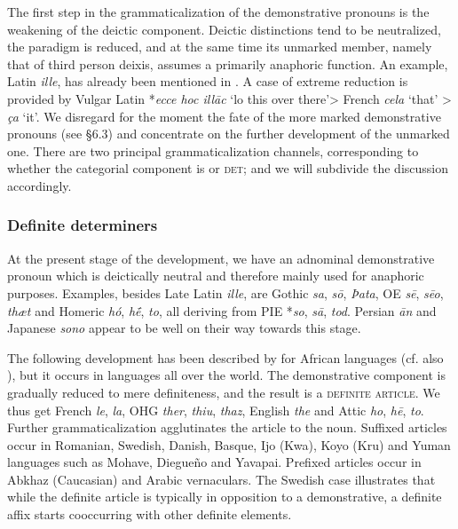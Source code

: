 The first step in the grammaticalization of the demonstrative pronouns is the weakening of the deictic component. Deictic distinctions tend to be neutralized, the paradigm is reduced, and at the same time its unmarked member, namely that of third person deixis, assumes a primarily anaphoric function. An example, Latin \textit{ille}, has already been mentioned in . A case of extreme reduction is provided by Vulgar Latin *\textit{ecce hoc ill\=ac} ‘lo this over there’{\textgreater} French \textit{cela} ‘that’ {\textgreater} \textit{ça} ‘it’. We disregard for the moment the fate of the more marked demonstrative pronouns (see §6.3) and concentrate on the further development of the unmarked one. There are two principal grammaticalization channels, corresponding to whether the categorial component is \np or \textsc{det}; and we will subdivide the discussion accordingly.

\subsubsection{Definite determiners}
At the present stage of the development, we have an adnominal demonstrative pronoun which is deictically neutral and therefore mainly used for anaphoric purposes. Examples, besides Late Latin \textit{ille}, are Gothic \textit{sa}, \textit{s\=o}, \textit{Þata}, OE \textit{s\=e}, \textit{s\=eo}, \textit{thæt} and Homeric \textit{hó}, \textit{h\'{\=e}}, \textit{to}, all deriving from PIE *\textit{so}, \textit{s\=a}, \textit{tod}. Persian \textit{\=an} and Japanese \textit{sono} appear to be well on their way towards this stage.

The following development has been described by \citet{Greenberg1978} for African languages (cf. also \citealt[§3]{Givón1978}), but it occurs in languages all over the world. The demonstrative component is gradually reduced to mere definiteness, and the result is a \textsc{definite article}. We thus get French \textit{le}, \textit{la}, OHG \textit{ther}, \textit{thiu}, \textit{thaz}, English \textit{the} and Attic \textit{ho}, \textit{h\=e}, \textit{to}. Further grammaticalization agglutinates the article to the noun. Suffixed articles occur in Romanian, Swedish, Danish, Basque, Ijo (Kwa), Koyo (Kru) and Yuman languages such as Mohave, Diegueño and Yavapai. Prefixed articles occur in Abkhaz (Caucasian) and Arabic vernaculars.\label{page42} The Swedish case illustrates that while the definite article is typically in opposition to a demonstrative, a definite affix starts cooccurring with other definite elements.

